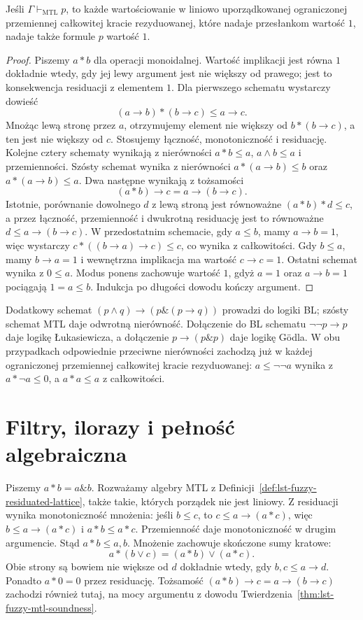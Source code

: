 \begin{twierdzenie}\label{thm:lst-fuzzy-mtl-soundness}
Jeśli $\Gamma\vdash_{\mathrm{MTL}}p$, to każde wartościowanie w liniowo
uporządkowanej ograniczonej przemiennej całkowitej kracie
rezyduowanej, które nadaje przesłankom wartość $1$, nadaje także
formule $p$ wartość $1$.
\end{twierdzenie}
\begin{proof}
Piszemy $a*b$ dla operacji monoidalnej. Wartość implikacji jest
równa $1$ dokładnie wtedy, gdy jej lewy argument jest nie większy
od prawego; jest to konsekwencja residuacji z elementem $1$.
Dla pierwszego schematu wystarczy dowieść
\[
(a\to b)*(b\to c)\leq a\to c.
\]
Mnożąc lewą stronę przez $a$, otrzymujemy element nie większy od
$b*(b\to c)$, a ten jest nie większy od $c$. Stosujemy łączność,
monotoniczność i residuację. Kolejne cztery schematy wynikają
z nierówności $a*b\leq a$, $a\wedge b\leq a$ i przemienności.
Szósty schemat wynika z nierówności $a*(a\to b)\leq b$ oraz
$a*(a\to b)\leq a$. Dwa następne wynikają z tożsamości
\[
 (a*b)\to c=a\to(b\to c).
\]
Istotnie, porównanie dowolnego $d$ z lewą stroną jest równoważne
$(a*b)*d\leq c$, a przez łączność, przemienność i dwukrotną
residuację jest to równoważne $d\leq a\to(b\to c)$.
W przedostatnim schemacie, gdy $a\leq b$, mamy $a\to b=1$,
więc wystarczy $c*((b\to a)\to c)\leq c$, co wynika z całkowitości.
Gdy $b\leq a$, mamy $b\to a=1$ i wewnętrzna implikacja ma wartość
$c\to c=1$. Ostatni schemat wynika z $0\leq a$.
Modus ponens zachowuje wartość $1$, gdyż $a=1$ oraz $a\to b=1$
pociągają $1=a\leq b$. Indukcja po długości dowodu kończy argument.
\end{proof}
Dodatkowy schemat $(p\wedge q)\to(p\mathbin{\&}(p\to q))$
prowadzi do logiki BL; szósty schemat MTL daje odwrotną nierówność.
Dołączenie do BL schematu $\neg\neg p\to p$ daje logikę
Łukasiewicza, a dołączenie $p\to(p\mathbin{\&}p)$ daje logikę
Gödla. W obu przypadkach odpowiednie przeciwne nierówności
zachodzą już w każdej ograniczonej przemiennej całkowitej kracie
rezyduowanej: $a\leq\neg\neg a$ wynika z $a*\neg a\leq0$,
a $a*a\leq a$ z całkowitości.

\section{Filtry, ilorazy i pełność algebraiczna}
Piszemy $a*b=a\mathbin{\&}b$. Rozważamy algebry MTL z
Definicji~\ref{def:lst-fuzzy-residuated-lattice}, także takie,
których porządek nie jest liniowy. Z residuacji wynika monotoniczność
mnożenia: jeśli $b\leq c$, to $c\leq a\to(a*c)$, więc
$b\leq a\to(a*c)$ i $a*b\leq a*c$. Przemienność daje
monotoniczność w drugim argumencie. Stąd $a*b\leq a,b$.
Mnożenie zachowuje skończone sumy kratowe:
\[
 a*(b\vee c)=(a*b)\vee(a*c).
\]
Obie strony są bowiem nie większe od $d$ dokładnie wtedy, gdy
$b,c\leq a\to d$. Ponadto $a*0=0$ przez residuację.
Tożsamość $(a*b)\to c=a\to(b\to c)$ zachodzi również tutaj,
na mocy argumentu z dowodu Twierdzenia~\ref{thm:lst-fuzzy-mtl-soundness}.

